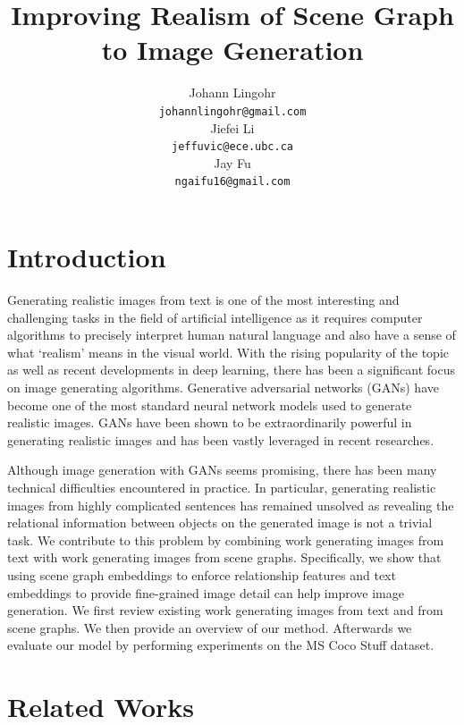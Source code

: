 \documentclass{article}
\title{Improving Realism of Scene Graph to Image Generation}
\author{%
  Johann Lingohr \\
  \texttt{johannlingohr@gmail.com} \\
  \And
  Jiefei Li \\
  \texttt{jeffuvic@ece.ubc.ca} \\
  \And
  Jay Fu \\
  \texttt{ngaifu16@gmail.com} \\
}
\begin{document}
\maketitle

\section{Introduction}

Generating realistic images from text is one of the most interesting and challenging tasks in the field of artificial intelligence as it requires computer algorithms to precisely interpret human natural language and also have a sense of what ‘realism’ means in the visual world. With the rising popularity of the topic as well as recent developments in deep learning, there has been a significant focus on image generating algorithms. Generative adversarial networks (GANs) \cite{gan} have become one of the most standard neural network models used to generate realistic images. GANs have been shown to be extraordinarily powerful in generating realistic images and has been vastly leveraged in recent researches.

Although image generation with GANs seems promising, there has been many technical difficulties encountered in practice. In particular, generating realistic images from highly complicated sentences has remained unsolved as revealing the relational information between objects on the generated image is not a trivial task. We contribute to this problem by combining work generating images from text with work generating images from scene graphs. Specifically, we show that using scene graph embeddings to enforce relationship features and text embeddings to provide fine-grained image detail can help improve image generation. We first review existing work generating images from text and from scene graphs. We then provide an overview of our method. Afterwards we evaluate our model by performing experiments on the MS Coco Stuff dataset.

\section{Related Works}
\end{document}
